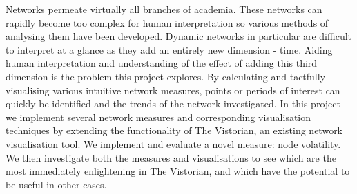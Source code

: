 

\begin{abstracts}

Networks permeate virtually all branches of academia. These networks can rapidly become too complex for human interpretation so various methods of analysing them have been developed. Dynamic networks in particular are difficult to interpret at a glance as they add an entirely new dimension - time. Aiding human interpretation and understanding of the effect of adding this third dimension is the problem this project explores.
By calculating and tactfully visualising various intuitive network measures, points or periods of interest can quickly be identified and the trends of the network investigated. In this project we implement several network measures and corresponding visualisation techniques by extending the functionality of The Vistorian, an existing network visualisation tool. We implement and evaluate a novel measure: node volatility. We then investigate both the measures and visualisations to see which are the most immediately enlightening in The Vistorian, and which have the potential to be useful in other cases.
\end{abstracts}
